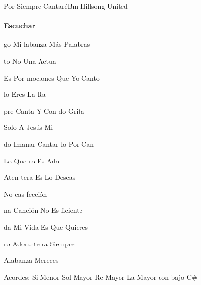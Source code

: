 \documentclass[12pt, spanish]{book}
\begin{document}
    \begin{song}{Por Siempre Cantaré}{Bm}
    {} %
    {Hillsong United}
    {} %
    {}
        \ifChordBk
        \paragraph{\mbox{}\hfill\protect\href{https://open.spotify.com/intl-es/track/02W84sfwDnnyDO4m3VsaTr}{Escuchar}\mbox{}\hfill}
        \fi


        \begin{SBOpGroup}
            go Mi labanza    Más   Palabras

            to No  Una Actua


             Es Por mociones   Que Yo Canto

            lo  Eres La Ra
        \end{SBOpGroup}

        \begin{SBChorus}
             pre Canta Y Con do Grita

            Solo A  Jesús Mi 


             do Imanar Cantar lo Por Can

            Lo Que ro Es Ado
        \end{SBChorus}

        \begin{SBOpGroup}
             Aten tera Es Lo  Deseas

             No cas fección

            na Canción No Es ficiente

            da Mi Vida Es  Que Quieres

            ro Adorarte ra Siempre

             Alabanza  Mereces
        \end{SBOpGroup}

        \ifChordBk
        \begin{SBOpGroup}
            Acordes:\break
            \upchord{\Bm}\qquad Si Menor \hfill
            \upchord{\G}\qquad Sol Mayor \hfill\null\break
            \upchord{\D}\qquad Re Mayor \hfill
            \upchord{\ACs}\qquad La Mayor con bajo C\# \hfill\null\break
        \end{SBOpGroup}
        \fi
    \end{song}
\end{document}
